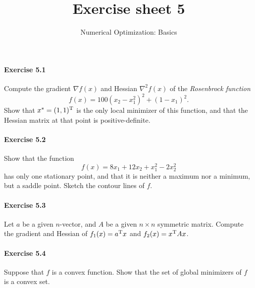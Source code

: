 
\title{Exercise sheet 5}
\subtitle{Numerical Optimization: Basics}
\usepackage{amsmath}
\usepackage{amsfonts}
\newcommand\R{\ensuremath{\mathbb{R}}}
\newcommand\dd{\ensuremath{\text{d}}}
\newcommand\tp{\ensuremath{\text{\upshape T}}}

\maketitle

\paragraph{Exercise 5.1} %
Compute  the gradient $\nabla f(x)$ and Hessian $\nabla^2f(x)$ of the
\emph{Rosenbrock function}
\begin{equation}\label{eq:rosenbrock}
  f(x) = 100(x_2-x_1^2)^2 + (1-x_1)^2.
\end{equation}
Show that $x^*=(1,1)^\tp$ is the only local minimizer of this function, and
that the Hessian matrix at that point is positive-definite.

\paragraph{Exercise 5.2} %
Show that the function
\[
  f(x) = 8x_1 + 12x_2 + x_1^2 - 2x_2^2
\]
has only one stationary point, and that it is neither a maximum nor a minimum,
but a saddle point. Sketch the contour lines of $f$.

\paragraph{Exercise 5.3} %
Let $a$ be a given $n$-vector, and $A$ be a given $n\times n$ symmetric matrix. Compute the
gradient and Hessian of $f_1(x) = a^\tp x$ and $f_2 (x) =x^\tp Ax$.


\paragraph{Exercise 5.4} %
Suppose that $f$ is a convex function. Show that the set of global minimizers
of $f$ is a convex set.

